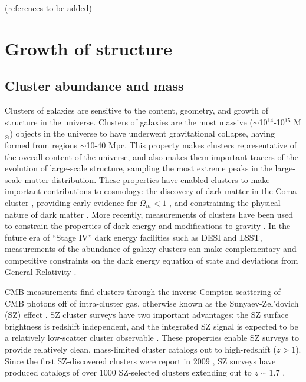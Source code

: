 (references to be added)



\section{Growth of structure}

\subsection{Cluster abundance and mass}

Clusters of galaxies are sensitive to the content, geometry, and growth of structure in the universe.  
Clusters of galaxies are the most massive ($\sim$10$^{14}$-10$^{15}$ M$_{\odot}$) objects in the universe to have underwent gravitational collapse, 
having formed from regions $\sim$10-40 Mpc.  This property makes clusters representative of the overall content of the universe, and also makes them 
important tracers of the evolution of large-scale structure, sampling the most extreme peaks in the large-scale matter distribution.  
These properties have enabled clusters to make important contributions to cosmology: the discovery of dark matter in the 
Coma cluster \cite{1933AcHPh...6..110Z}, 
providing early evidence for $\Omega_m < 1$ \cite{white93a, Donahue98, Bahcall98}, and
constraining the physical nature of dark matter \cite{Clowe06}.  
More recently, measurements of clusters have been used to constrain the properties of dark energy and modifications 
to gravity \cite{vikhlinin09, mantz10a, rapetti13, benson13, mantz14, mantz15}.   In the future era of ``Stage IV'' dark energy 
facilities such as DESI and LSST, measurements of the abundance of galaxy clusters can make complementary and 
competitive constraints on the dark energy equation of state and deviations from General Relativity \cite{weinberg13}.  

CMB measurements find clusters through the inverse Compton scattering of CMB photons off of intra-cluster gas, otherwise 
known as the Sunyaev-Zel'dovich (SZ) effect \cite{sunyaev72}. SZ cluster surveys have two important advantages: 
the SZ surface brightness is redshift independent, and the integrated SZ signal is expected to be a relatively 
low-scatter cluster observable \cite{nagai06, nagai07, kravtsov12}.  These properties enable SZ surveys to provide 
relatively clean, mass-limited cluster catalogs out to high-redshift ($z > 1$).  Since the first SZ-discovered clusters were 
report in 2009 \cite{staniszewski09}, SZ surveys have produced catalogs of over 1000 SZ-selected clusters extending out to $z \sim 1.7$ 
\cite{vanderlinde10, reichardt13, hasselfield13, planck13-29, bleem15b, planck15-32}.  


